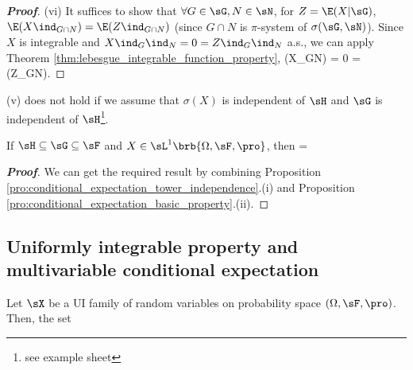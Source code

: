 \begin{proof}[\bf Proof]
\item [(vi)] It suffices to show that $\forall G\in \sG,N\in \sN$, for $Z= \E(X|\sG)$, $\E(X\ind_{G\cap N}) = \E(Z\ind_{G\cap N})$ (since $G\cap N$ is $\pi$-system of $\sigma(\sG,\sN)$). Since $X$ is integrable and $X\ind_G\ind_N = 0 = Z\ind_G\ind_N$ a.s., we can apply Theorem \ref{thm:lebesgue_integrable_function_property}, %
\be
\E(X\ind_{G\cap N}) = 0 = \E(Z\ind_{G\cap N}). %
\ee
\een
\end{proof}

\begin{remark}
(v) does not hold if we assume that $\sigma(X)$ is independent of $\sH$ and $\sG$ is independent of $\sH$\footnote{see example sheet}.
\end{remark}

\begin{proposition}
If $\sH\subseteq \sG \subseteq \sF$ and $X\in \sL^1\brb{\Omega,\sF,\pro}$, then
\be
\E{} = \E{} 
\ee
\end{proposition}

\begin{proof}[\bf Proof]
We can get the required result by combining Proposition \ref{pro:conditional_expectation_tower_independence}.(i) and Proposition \ref{pro:conditional_expectation_basic_property}.(ii).
\end{proof}




\subsection{Uniformly integrable property and multivariable conditional expectation}

\begin{theorem}\label{thm:ui_conditional_expectation_implies_ui}
Let $\sX$ be a UI family of random variables on probability space $(\Omega,\sF,\pro)$. Then, the set
\be
{} \quad {}
\ee
\end{theorem}

